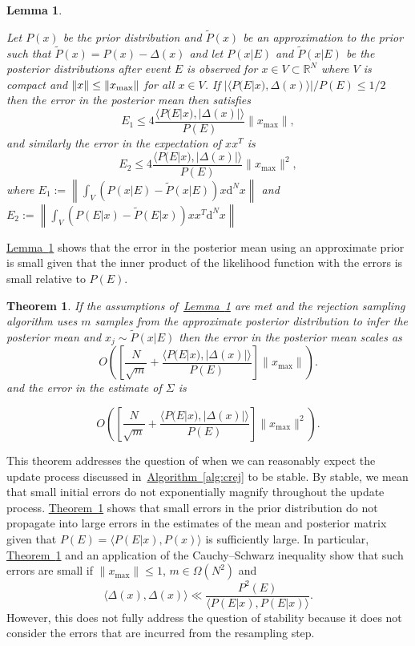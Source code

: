\documentclass{article} %
\newtheorem{theorem}{Theorem}
\newtheorem{lemma}{Lemma}
\newcommand{\thm}[1]{\hyperref[thm:#1]{Theorem~\ref*{thm:#1}}}
\newcommand{\lem}[1]{\hyperref[lem:#1]{Lemma~\ref*{lem:#1}}}
\newcommand{\alg}[1]{\hyperref[alg:#1]{Algorithm~\ref*{alg:#1}}}
\begin{document}
\begin{lemma}
    \label{lem:errprop}

    Let $P(x)$ be the prior distribution and $\tilde{P}(x)$ be an approximation to the prior such that $\tilde{P}(x) = P(x) -\Delta(x)$ and let $P(x|E)$ and $\tilde{P}(x|E)$ be the posterior distributions after event $E$ is observed for $x\in V\subset \mathbb{R}^N$ where $V$ is compact and $\|x\|\le \|x_{\rm max}\|$ for all $x\in V$.  If $|\langle P(E|x),\Delta(x) \rangle|/P(E) \le 1/2$ then the error in the posterior mean then satisfies
    $$
    E_1 \le 4 \frac{\langle P(E|x), |\Delta(x)|\rangle}{P(E)}\|x_{\max}\|,
    $$
    and similarly the error in the expectation of $xx^T$ is
    $$
    E_2 \le 4 \frac{\langle P(E|x), |\Delta(x)|\rangle}{P(E)}\|x_{\max}\|^2,
    $$
where $E_1:=\left\|\int_V  (P(x|E) -\tilde{P}(x|E)) x \mathrm{d}^N x \right\|$ and $E_2 := \left\|\int_V  (P(E|x) -\tilde{P}(E|x)) xx^T \mathrm{d}^N x \right\|$
\end{lemma}

\lem{errprop} shows that the error in the posterior mean using an approximate prior is small given that the inner product of the likelihood function with the errors is small relative to $P(E)$. 

\begin{theorem}\label{thm:meanCov}
If the assumptions of~\lem{errprop} are met and the rejection sampling algorithm uses $m$ samples from the approximate posterior distribution to infer the posterior mean  and $x_j\sim \tilde{P}(x|E)$ then the error in the posterior mean scales as
$$
 O\left(\left[\frac{{N}}{\sqrt{m}} +\frac{\langle P(E|x), |\Delta(x)|\rangle}{P(E)}\right]\|x_{\max}\|\right).
$$
and the error in the estimate of $\Sigma$ is

$$
 O\left(\left[\frac{{N} }{\sqrt{m}} +\frac{\langle P(E|x), |\Delta(x)|\rangle}{P(E)}\right]\|x_{\max}\|^2\right).
$$
\end{theorem}

This theorem addresses the question of when we can reasonably expect the update process discussed in~\alg{crej} to be stable.  By stable, we mean that small initial errors do not exponentially magnify throughout the update process.  \thm{meanCov} shows that small errors in the prior distribution do not propagate into large errors in the estimates of the mean and posterior matrix given that $P(E)= \langle P(E|x),P(x)\rangle$ is sufficiently large.  In particular, \thm{meanCov} and an application of the Cauchy--Schwarz inequality show that such errors are small if $\|x_{\max}\|\le 1$, $m\in \Omega(N^2)$ and 
$$
\langle\Delta(x),\Delta(x)\rangle \ll \frac{P^2(E)}{{\langle P(E|x),P(E|x)\rangle}}.
$$
However, this does not fully address the question of stability because it does not consider the errors that are incurred from the resampling step.
\end{document}
